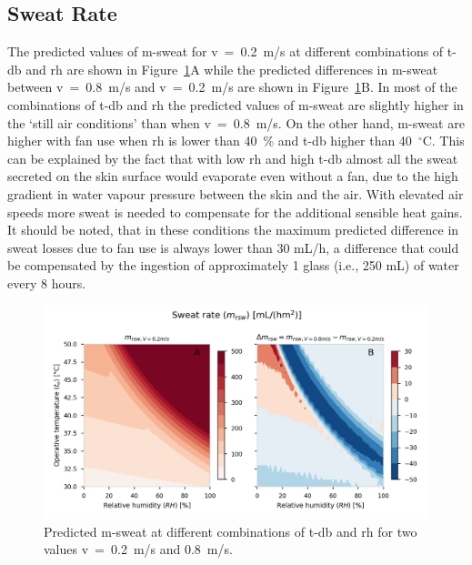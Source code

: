 \subsection{Sweat Rate}\label{subsec:sweat-rate}

The predicted values of \ac{m-sweat} for \ac{v}~=~0.2~m/s at different combinations of \ac{t-db} and \ac{rh} are shown in Figure~\ref{fig:sweat_rate}A while the predicted differences in \ac{m-sweat} between \ac{v}~=~0.8~m/s and \ac{v}~=~0.2~m/s are shown in Figure~\ref{fig:sweat_rate}B\@.
In most of the combinations of \ac{t-db} and \ac{rh} the predicted values of \ac{m-sweat} are slightly higher in the `still air conditions' than when \ac{v}~=~0.8~m/s.
On the other hand, \ac{m-sweat} are higher with fan use when \ac{rh} is lower than 40~\% and \ac{t-db} higher than 40~$^{\circ}$C\@.
This can be explained by the fact that with low \ac{rh} and high \ac{t-db} almost all the sweat secreted on the skin surface would evaporate even without a fan, due to the high gradient in water vapour pressure between the skin and the air.
With elevated air speeds more sweat is needed to compensate for the additional sensible heat gains.
It should be noted, that in these conditions the maximum predicted difference in sweat losses due to fan use is always lower than 30 mL/h, a difference that could be compensated by the ingestion of approximately 1 glass (i.e., 250 mL) of water every 8 hours.

\begin{figure}[hbt!]
    \centering
    \includegraphics[width=\textwidth]{figures/sweat_rate}
    \caption{Predicted \acf{m-sweat} at different combinations of \acf{t-db} and \acf{rh} for two values \acf{v}~=~0.2~m/s and 0.8~m/s.}
    \label{fig:sweat_rate}
\end{figure}

